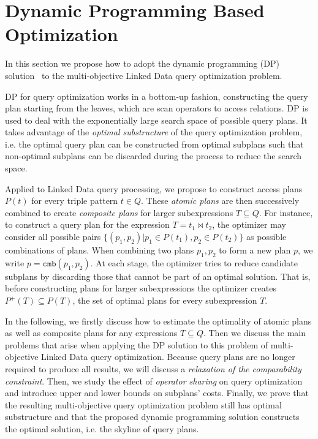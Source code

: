 \section{Dynamic Programming Based Optimization}
\label{sec:opt}
In this section we propose how to adopt the dynamic
programming (DP) solution~\cite{selinger_access_1979} to the 
multi-objective Linked Data query optimization problem. 

DP for query optimization works in a
bottom-up fashion, constructing the query plan starting from the
leaves, which are scan operators to access
relations. DP is used to deal with the
exponentially large search space of possible query plans. It takes
advantage of the \emph{optimal substructure} of the query optimization
problem, i.e. the optimal query plan can be constructed from
optimal subplans such that non-optimal subplans can be
discarded during the process to reduce the search space.


Applied to Linked Data query processing, we propose to construct access plans $P(t)$ for every triple pattern $t \in Q$. These \emph{atomic plans} are then successively combined 
to create \emph{composite plans} for larger subexpressions $T \subseteq Q$. 
For instance, to construct a query plan for the expression $T=t_1\Join t_2$, the optimizer may consider all possible pairs $\{(p_1,p_2) | p_1 \in P(t_1),p_2 \in P(t_2)\}$ as possible combinations of plans. When combining two plans $p_1,p_2$ to form a new plan $p$, we
write $p = \mathtt{cmb}(p_1,p_2)$. At each stage, the optimizer 
tries to reduce candidate subplans by discarding those that cannot be part of an optimal solution. That is, before constructing plans for larger subexpressions the optimizer creates $P^+(T) \subseteq
P(T)$, the set of optimal plans for every subexpression $T$. 


In the following, we firstly discuss how to estimate the optimality of atomic plans as well as composite plans for any expressions $T \subseteq Q$. Then we discuss the main problems that arise when applying the DP solution to this problem of multi-objective Linked Data query optimization.  Because query plans are no longer required to produce all results, we will
discuss a \emph{relaxation of the comparability constraint}. Then, we study the effect of \emph{operator sharing} on query optimization and introduce upper and lower bounds on subplans'
costs. Finally, we prove that the resulting multi-objective query optimization problem still has optimal
substructure and that the proposed dynamic programming solution constructs the
optimal solution, i.e. the skyline of query plans.

